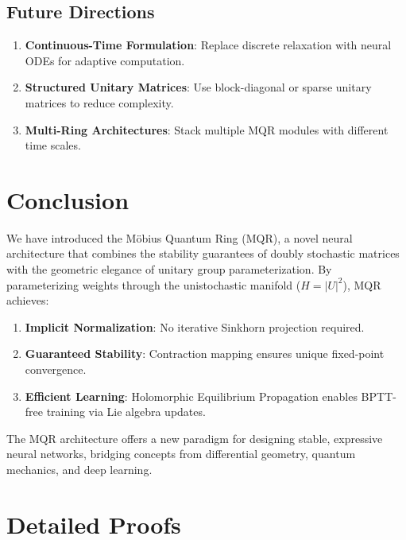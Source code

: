 \documentclass[11pt,a4paper]{article}
\begin{document}
\subsection{Future Directions}

\begin{enumerate}
    \item \textbf{Continuous-Time Formulation}: Replace discrete relaxation with neural ODEs for adaptive computation.
    
    \item \textbf{Structured Unitary Matrices}: Use block-diagonal or sparse unitary matrices to reduce complexity.
    
    \item \textbf{Multi-Ring Architectures}: Stack multiple MQR modules with different time scales.
\end{enumerate}

\section{Conclusion}
\label{sec:conclusion}

We have introduced the Möbius Quantum Ring (MQR), a novel neural architecture that combines the stability guarantees of doubly stochastic matrices with the geometric elegance of unitary group parameterization. By parameterizing weights through the unistochastic manifold ($H = |U|^2$), MQR achieves:

\begin{enumerate}
    \item \textbf{Implicit Normalization}: No iterative Sinkhorn projection required.
    \item \textbf{Guaranteed Stability}: Contraction mapping ensures unique fixed-point convergence.
    \item \textbf{Efficient Learning}: Holomorphic Equilibrium Propagation enables BPTT-free training via Lie algebra updates.
\end{enumerate}

The MQR architecture offers a new paradigm for designing stable, expressive neural networks, bridging concepts from differential geometry, quantum mechanics, and deep learning.

\appendix

\section{Detailed Proofs}
\label{app:proofs}
\end{document}
